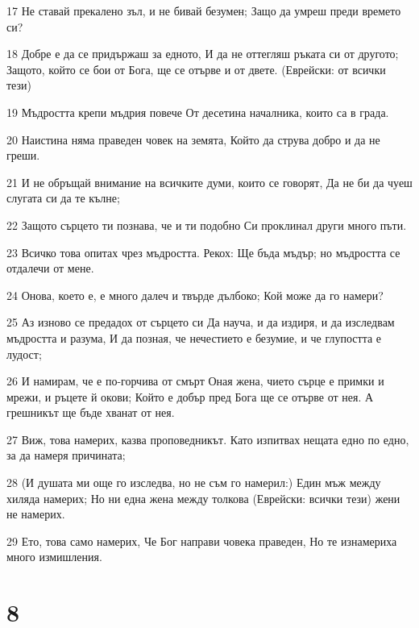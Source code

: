 \par 17 Не ставай прекалено зъл, и не бивай безумен; Защо да умреш преди времето си?
\par 18 Добре е да се придържаш за едното, И да не оттегляш ръката си от другото; Защото, който се бои от Бога, ще се отърве и от двете. (Еврейски: от всички тези)
\par 19 Мъдростта крепи мъдрия повече От десетина началника, които са в града.
\par 20 Наистина няма праведен човек на земята, Който да струва добро и да не греши.
\par 21 И не обръщай внимание на всичките думи, които се говорят, Да не би да чуеш слугата си да те кълне;
\par 22 Защото сърцето ти познава, че и ти подобно Си проклинал други много пъти.
\par 23 Всичко това опитах чрез мъдростта. Рекох: Ще бъда мъдър; но мъдростта се отдалечи от мене.
\par 24 Онова, което е, е много далеч и твърде дълбоко; Кой може да го намери?
\par 25 Аз изново се предадох от сърцето си Да науча, и да издиря, и да изследвам мъдростта и разума, И да позная, че нечестието е безумие, и че глупостта е лудост;
\par 26 И намирам, че е по-горчива от смърт Оная жена, чието сърце е примки и мрежи, и ръцете й окови; Който е добър пред Бога ще се отърве от нея. А грешникът ще бъде хванат от нея.
\par 27 Виж, това намерих, казва проповедникът. Като изпитвах нещата едно по едно, за да намеря причината;
\par 28 (И душата ми още го изследва, но не съм го намерил:) Един мъж между хиляда намерих; Но ни една жена между толкова (Еврейски: всички тези) жени не намерих.
\par 29 Ето, това само намерих, Че Бог направи човека праведен, Но те изнамериха много измишления.

\chapter{8}

